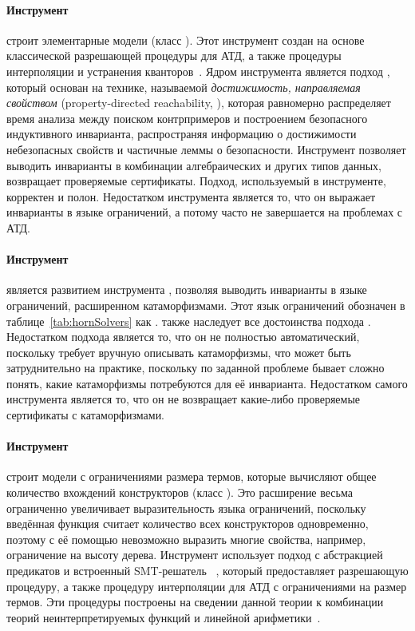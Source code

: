 \paragraph{Инструмент \spacer{}~\cite{komuravelli2016smt}} строит элементарные модели (класс \elemclass{}). Этот инструмент создан на основе классической разрешающей процедуры для АТД, а также процедуры интерполяции и устранения кванторов~\cite{bjorner2015playing}. Ядром инструмента является подход \spacer{}, который основан на технике, называемой \emph{достижимость, направляемая свойством} \foreignlanguage{english}{(property-directed reachability, \pdr{})}, которая равномерно распределяет время анализа между поиском контрпримеров и построением безопасного индуктивного инварианта, распространяя информацию о достижимости небезопасных свойств и частичные леммы о безопасности. Инструмент позволяет выводить инварианты в комбинации алгебраических и других типов данных, возвращает проверяемые сертификаты. Подход, используемый в инструменте, корректен и полон. Недостатком инструмента является то, что он выражает инварианты в языке ограничений, а потому часто не завершается на проблемах с АТД.

\paragraph{Инструмент \racer{}~\cite{10.1145/3498722}} является развитием инструмента \spacer{}, позволяя выводить инварианты в языке ограничений, расширенном катаморфизмами. Этот язык ограничений обозначен в таблице~\ref{tab:hornSolvers} как \catelemclass{}. \racer{} также наследует все достоинства подхода \spacer{}. Недостатком подхода является то, что он не полностью автоматический, поскольку требует вручную описывать катаморфизмы, что может быть затруднительно на практике, поскольку по заданной проблеме бывает сложно понять, какие катаморфизмы потребуются для её инварианта. Недостатком самого инструмента является то, что он не возвращает какие-либо проверяемые сертификаты с катаморфизмами.

\paragraph{Инструмент \eldarica{}~\cite{8603013}} строит модели с ограничениями размера термов, которые вычисляют общее количество вхождений конструкторов (класс \sizeelemclass{}). Это расширение весьма ограниченно увеличивает выразительность языка ограничений, поскольку введённая функция считает количество всех конструкторов одновременно, поэтому с её помощью невозможно выразить многие свойства, например, ограничение на высоту дерева. Инструмент \eldarica{} использует подход \cegar{} с абстракцией предикатов и встроенный SMT-решатель \princess{}~\cite{princess}, который предоставляет разрешающую процедуру, а также процедуру интерполяции для АТД с ограничениями на размер термов. Эти процедуры построены на сведении данной теории к комбинации теорий неинтерпретируемых функций и линейной арифметики~\cite{hojjat2017deciding}.

